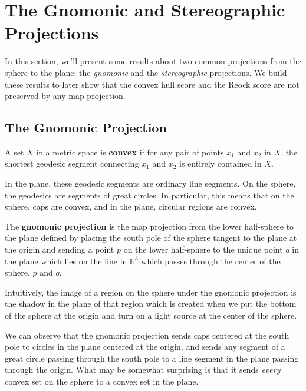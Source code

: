 \section{The Gnomonic and Stereographic Projections}\label{sec:gnom_stereo}
In this section, we'll present some results about two common
projections from the sphere to the plane: the \textit{gnomonic} and
the \textit{stereographic} projections.  We build these results to 
later show that the convex hull score and the Reock score are not preserved
by any map projection.

\subsection{The Gnomonic Projection}


\begin{definition}
  A set $X$ in a metric space is \textbf{convex} if for any pair of
  points $x_1$ and $x_2$ in $X$, the shortest geodesic segment
  connecting $x_1$ and $x_2$ is entirely contained in $X$. 
\end{definition}
In the plane, these geodesic segments are ordinary line segments.  On
the sphere, the geodesics are segments of great circles. In 
particular, this means that on the sphere, caps are 
convex, and in the plane, circular regions are convex.


\begin{definition}
  The \textbf{gnomonic projection} is the map projection from the
  lower half-sphere to the plane defined by placing the south pole of
  the sphere tangent to the plane at the origin and sending a point
  $p$ on the lower half-sphere to the unique point $q$ in the plane
  which lies on the line in $\mathbb{R}^3$ which passes through the
  center of the sphere, $p$ and $q$.
\end{definition}
Intuitively, the image of a region on the sphere under the gnomonic
projection is the shadow in the plane of that region which is
created when we put the bottom of the sphere at the origin and turn
on a light source at the center of the sphere.


We can observe that the gnomonic projection sends caps centered at the
south pole to circles in the plane centered at the origin, and sends
any segment of a great circle passing through the south pole to a line
segment in the plane passing through the origin.  What may be somewhat
surprising is that it sends \textit{every} convex set on the sphere to
a convex set in the plane.

